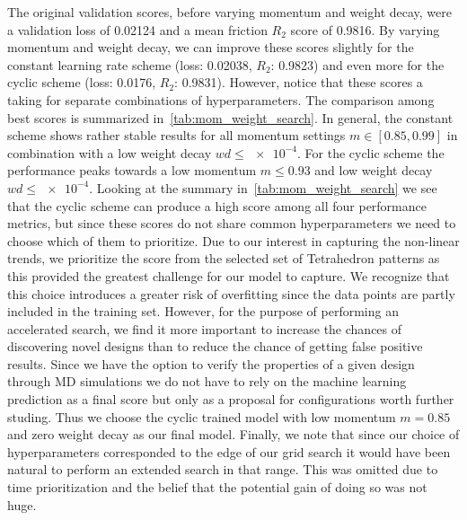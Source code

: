 The original validation scores, before varying momentum and weight decay, were a
validation loss of 0.02124 and a mean friction $R_2$ score of 0.9816. By varying
momentum and weight decay, we can improve these scores slightly for the constant
learning rate scheme (loss: 0.02038, $R_2$: 0.9823) and even more for the cyclic
scheme (loss: 0.0176, $R_2$: 0.9831). However, notice that these scores a taking
for separate combinations of hyperparameters. The comparison among best scores is
summarized in~\cref{tab:mom_weight_search}. In general, the constant scheme
shows rather stable results for all momentum settings $m \in [0.85, 0.99]$ in
combination with a low weight decay $wd \le \num{e-4}$. For the cyclic scheme
the performance peaks towards a low momentum $m \le 0.93$ and low weight decay
$wd \le \num{e-4}$. Looking at the summary in~\cref{tab:mom_weight_search} we
see that the cyclic scheme can produce a high score among all four
performance metrics, but since these scores do not share common hyperparameters we need to choose which of them to prioritize. Due to our interest in capturing the non-linear trends, we prioritize the score from the
selected set of Tetrahedron patterns as this provided the greatest challenge for our model to capture. We recognize that this choice introduces a greater risk of
overfitting since the data points are partly included in the training set. However, for the purpose of performing an accelerated search, we find it more important to increase the chances of discovering novel designs than to reduce the chance of getting false positive results. Since we have the option to verify the properties of a given design through \acrshort{MD} simulations we do not have to rely on the machine learning prediction as a final score but only as a proposal for configurations worth further studing. Thus we choose the cyclic trained model with low momentum $m = 0.85$ and zero weight decay as our final model. Finally, we note that since our choice of hyperparameters corresponded to the edge of our grid search it would have been natural to perform an extended search in that range. This was omitted due to time prioritization and the belief that the potential gain of doing so was not huge.


